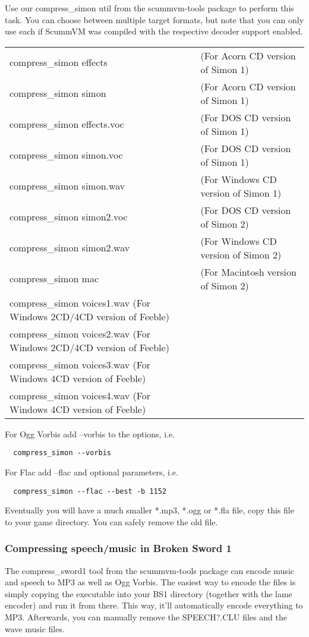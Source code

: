 Use our compress\_simon util from the scummvm-tools package to perform this task.
You can choose between multiple target formats, but note that you can only use
each if ScummVM was compiled with the respective decoder support enabled.

\begin{tabular}[h]{ll}
  compress\_simon effects    &(For Acorn CD version of Simon 1)\\
  compress\_simon simon      &(For Acorn CD version of Simon 1)\\
  compress\_simon effects.voc&(For DOS CD version of Simon 1)\\
  compress\_simon simon.voc  &(For DOS CD version of Simon 1)\\
  compress\_simon simon.wav  &(For Windows CD version of Simon 1)\\
  compress\_simon simon2.voc &(For DOS CD version of Simon 2)\\
  compress\_simon simon2.wav &(For Windows CD version of Simon 2)\\
  compress\_simon mac        &(For Macintosh version of Simon 2)\\

  compress\_simon voices1.wav (For Windows 2CD/4CD version of Feeble)\\
  compress\_simon voices2.wav (For Windows 2CD/4CD version of Feeble)\\
  compress\_simon voices3.wav (For Windows 4CD version of Feeble)\\
  compress\_simon voices4.wav (For Windows 4CD version of Feeble)\\
\end{tabular}

For Ogg Vorbis add --vorbis to the options, i.e.
\begin{verbatim}
  compress_simon --vorbis
\end{verbatim}
%
For Flac add --flac and optional parameters, i.e.
\begin{verbatim}
  compress_simon --flac --best -b 1152
\end{verbatim}
%
Eventually you will have a much smaller *.mp3, *.ogg or *.fla file, copy this
file to your game directory. You can safely remove the old file.


\subsubsection{Compressing speech/music in Broken Sword 1}

The compress\_sword1 tool from the scummvm-tools package can encode music and
speech to MP3 as well as Ogg Vorbis.
The easiest way to encode the files is simply copying the executable into your
BS1 directory (together with the lame encoder) and run it from there.
This way, it'll automatically encode everything to MP3.
Afterwards, you can manually remove the SPEECH?.CLU files and the wave music
files.

